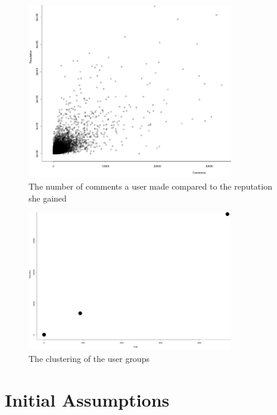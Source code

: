 \documentclass[conference]{IEEEtran}
\begin{document}
\begin{figure}[h]
 \includegraphics[width=9cm]{Plots/comments_vs_rep.png}
 \caption{The number of comments a user made compared to the reputation she gained}
 \label{comments_vs_rep}
\end{figure}

\begin{figure}[h]
 \includegraphics[width=9cm]{Plots/clustering.png}
 \caption{The clustering of the user groups}
 \label{kmeans_clustering}
\end{figure}


\section{Initial Assumptions}
\label{InitialAssumptions}
\end{document}
